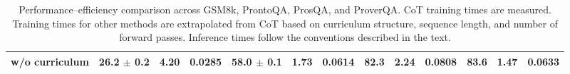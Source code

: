 \begin{table}[t]
\begin{tabular}{lcccccccccccc}
\quad w/o curriculum 
& 26.2 $\pm$ 0.2 & 4.20 & 0.0285
& 58.0 $\pm$ 0.1 & 1.73 & 0.0614
& 82.3 & 2.24 & 0.0808
& 83.6 & 1.47 & 0.0633 \\

\bottomrule
\end{tabular}
\caption{Performance--efficiency comparison across GSM8k, ProntoQA, ProsQA, and ProverQA.
CoT training times are measured.
Training times for other methods are extrapolated from CoT based on curriculum structure, sequence length,
and number of forward passes.
Inference times follow the conventions described in the text.}
\label{tab:main_results}
\end{table}